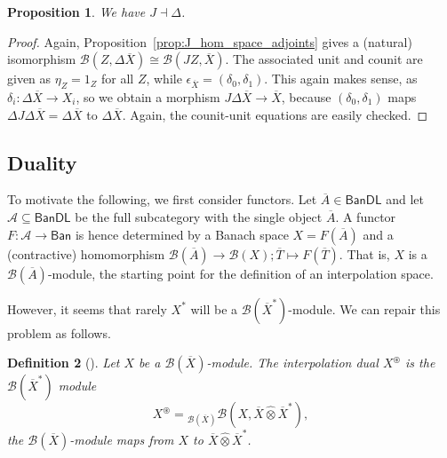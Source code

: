 \documentclass[a4paper,11pt]{article}
\theoremstyle{plain}
\newtheorem{proposition}{Proposition}[section]
\newtheorem{definition}[proposition]{Definition}
\theoremstyle{remark}
\newcommand{\mc}[1]{\mathcal{#1}}
\newcommand{\msf}[1]{\mathsf{#1}}
\newcommand{\proten}{\widehat\otimes}
\newcommand{\intdual}{\circledast}
\begin{document}
\begin{proposition}
We have $J \dashv \Delta$.
\end{proposition}
\begin{proof}
Again, Proposition~\ref{prop:J_hom_space_adjoints} gives a (natural) isomorphism $\mc B(Z, \Delta\overline X) \cong \mc B(JZ, \overline X)$.  The associated unit and counit are given as
$\eta_Z = 1_Z$ for all $Z$, while $\epsilon_{\overline X} = (\delta_0, \delta_1)$.  This again makes sense, as $\delta_i \colon \Delta\overline X \to X_i$, so we obtain a morphism $J\Delta\overline X \to \overline X$, because $(\delta_0, \delta_1)$ maps $\Delta J\Delta\overline X = \Delta\overline X$ to $\Delta\overline X$.  Again, the counit-unit equations are easily checked.
\end{proof}




\subsection{Duality}

To motivate the following, we first consider functors.  Let $\overline A \in \msf{BanDL}$ and let $\mc A \subseteq \msf{BanDL}$ be the full subcategory with the single object $\overline A$.  A functor $F \colon \mc A \to \msf{Ban}$ is hence determined by a Banach space $X = F(\overline A)$ and a (contractive) homomorphism $\mc B(\overline A) \to \mc B(X); \overline T \mapsto F(\overline T)$.  That is, $X$ is a $\mc B(\overline A)$-module, the starting point for the definition of an interpolation space.

However, it seems that rarely $X^*$ will be a $\mc B(\overline X^*)$-module.  We can repair this problem as follows.

\begin{definition}[{\cite[Definition~IV.5.7]{KP_InterpolationFunctorsDuality}}]
Let $X$ be a $\mc B(\overline X)$-module.  The \emph{interpolation dual} $X^\intdual$ is the $\mc B(\overline X^*)$ module
\[ X^\intdual = {}_{\mc B(\overline X)}\mc B(X, \overline X \proten \overline X^*), \]
the $\mc B(\overline X)$-module maps from $X$ to $\overline X \proten \overline X^*$.
\end{definition}
\end{document}
